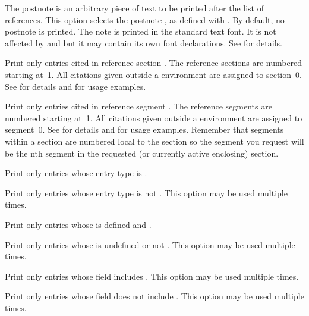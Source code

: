 \begin{optionlist*}

The postnote is an arbitrary piece of text to be printed after the list of references. This option selects the postnote , as defined with . By default, no postnote is printed. The note is printed in the standard text font. It is not affected by  and  but it may contain its own font declarations. See  for details.


Print only entries cited in reference section . The reference sections are numbered starting at~1. All citations given outside a  environment are assigned to section~0. See  for details and  for usage examples.


Print only entries cited in reference segment . The reference segments are numbered starting at~1. All citations given outside a  environment are assigned to segment~0. See  for details and  for usage examples. Remember that segments within a section are numbered local to the section so the segment you request will be the nth segment in the requested (or currently active enclosing) section.


Print only entries whose entry type is .


Print only entries whose entry type is not . This option may be used multiple times.


Print only entries whose  is defined and .


Print only entries whose  is undefined or not . This option may be used multiple times.


Print only entries whose  field includes . This option may be used multiple times.


Print only entries whose  field does not include . This option may be used multiple times.


\end{optionlist*}
